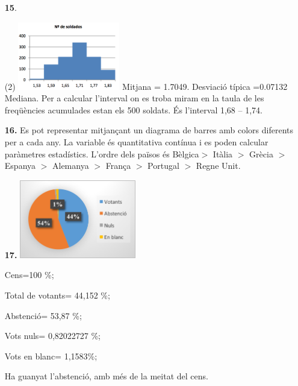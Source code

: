 \documentclass[a4paper, pdf, twoside]{book}
\begin{document}
\begin{multicols}{2}
\begin{enumerate}
 \item[\fontfamily{phv}\selectfont\color{blue}\textbf{15}. ] 
 \begin{tasks}[column-sep=1em, item-indent=1.3333em](2)
	 \task* \includegraphics [width=0.35\textwidth ]{img-sol/t4-15}
	 \task* Mitjana = 1.7049. Desviació típica =0.07132
	 \task* Mediana. Per a calcular l'interval on es troba miram
	 \task* en la taula de les freqüències acumulades
	 \task* estan els 500 soldats. És l'interval 1,68 – 1,74.\par {} 
\end{tasks}
\vspace{0.25cm}
\item[\fontfamily{phv}\selectfont\color{blue}\textbf{16. }] 
Es pot representar mitjançant un diagrama de barres amb colors diferents per a cada any. La variable és quantitativa contínua i es poden calcular paràmetres estadístics. L'ordre dels països és Bèlgica$>$ Itàlia $>$ Grècia $>$ Espanya $>$ Alemanya $>$ França $>$ Portugal $>$ Regne Unit.\par {}
\vspace{0.25cm}
\item[\fontfamily{phv}\selectfont\color{blue}\textbf{17. }] 
 \includegraphics [width=0.4\textwidth ]{img-sol/t4-17} \par Cens=100 \%;\par Total de votants= 44,152 \%; \par Abstenció= 53,87 \%; \par Vots nuls= 0,82022727 \%; \par Vots en blanc= 1,1583\%; \par Ha guanyat l'abstenció, amb més de la meitat del cens.\par {}
 \end{enumerate}
\vspace{0.3cm}


\end{multicols}
\end{document}
